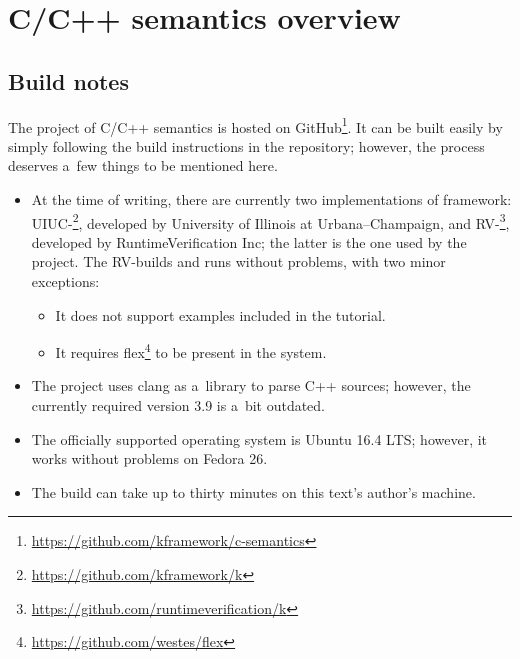 \documentclass{fithesis3}
\begin{document}
\fi %

\chapter{\K C/C++ semantics overview}





\section{Build notes}
The project of \K C/C++ semantics is hosted on GitHub\footnote{\url{https://github.com/kframework/c-semantics}}. It can be built easily by simply following the build instructions in the repository; however, the process deserves a~few things to be mentioned here.

\begin{itemize}
\item At the time of writing, there are currently two implementations of \K framework: UIUC-\K\footnote{\url{https://github.com/kframework/k}}, developed by University of Illinois at Urbana–Champaign, and RV-\K\footnote{\url{https://github.com/runtimeverification/k}}, developed by RuntimeVerification Inc; the latter is the one used by the project. The RV-\K builds and runs without problems, with two minor exceptions:
\begin{itemize}
\item It does not support examples included in the \K tutorial.
\item It requires flex\footnote{\url{https://github.com/westes/flex}} to be present in the system.
\end{itemize}
\item The project uses clang as a~library to parse C++ sources; however, the currently required version 3.9 is a~bit outdated.
\item The officially supported operating system is Ubuntu 16.4 LTS; however, it works without problems on Fedora 26.
\item The build can take up to thirty minutes on this text's author's machine.
\end{itemize}

\end{document}
